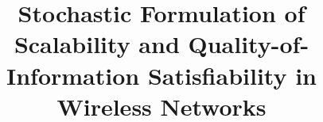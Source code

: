 \documentclass[conference]{IEEEtran}
\begin{document}
%
\title{Stochastic Formulation of Scalability and Quality-of-Information Satisfiability in Wireless Networks}

\IEEEoverridecommandlockouts




%
\end{document}
